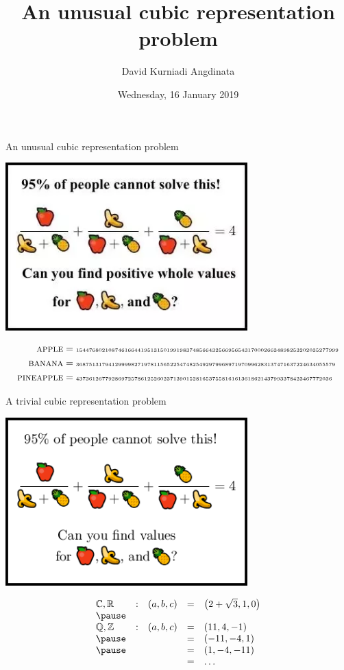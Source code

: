 \documentclass[8pt,t]{beamer}
\title{An unusual cubic representation problem}
\author{David Kurniadi Angdinata}
\date{Wednesday, 16 January 2019}
\newcommand{\rb}[1]{\left( #1 \right)}
\newcommand{\C}{\mathbb{C}}
\newcommand{\R}{\mathbb{R}}
\newcommand{\Q}{\mathbb{Q}}
\newcommand{\Z}{\mathbb{Z}}
\begin{document}
\begin{frame}
\maketitle
\end{frame}

\begin{frame}{An unusual cubic representation problem}
\begin{center}
\includegraphics[width=0.7\textwidth]{img/positive_whole_values.png}
\end{center}
\pause
\begin{align*}
\textsc{apple} & = \text{\tiny 154476802108746166441951315019919837485664325669565431700026634898253202035277999} \\
\textsc{banana} & = \text{\tiny 36875131794129999827197811565225474825492979968971970996283137471637224634055579} \\
\textsc{pineapple} & = \text{\tiny 4373612677928697257861252602371390152816537558161613618621437993378423467772036}
\end{align*}
\end{frame}

\begin{frame}{A trivial cubic representation problem}
\begin{center}
\includegraphics[width=0.7\textwidth]{img/values.png}
\end{center}
\pause
$$
\begin{array}{lllll}
\C, \R & : & \rb{a, b, c} & = & \rb{2 + \sqrt{3}, 1, 0} \\
\pause
& & \\
\Q, \Z & : & \rb{a, b, c} & = & \rb{11, 4, -1} \\
\pause
& & & = & \rb{-11, -4, 1} \\
\pause
& & & = & \rb{1, -4, -11} \\
& & & = & \dots
\end{array}
$$
\end{frame}
\end{document}
